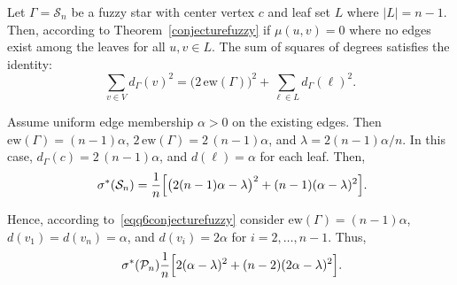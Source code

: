 \documentclass[12pt]{amsart}
\newcommand{\ew}{\mathrm{ew}}
\newcommand{\SF}{\sigma^*}
\begin{document}
Let $\Gamma=\mathcal{S}_n$ be a fuzzy star with center vertex $c$ and leaf set $L$ where $|L|=n-1$. Then, according to Theorem~\ref{conjecturefuzzy}  if $\mu(u,v) = 0$ where no edges exist among the leaves for all $u,v \in L$.
The sum of squares of degrees satisfies the identity:
\[
\sum_{v \in V} d_\Gamma(v)^2=\Big(2\,\ew(\Gamma)\Big)^2+\sum_{\ell \in L} d_\Gamma(\ell)^2.
\]



Assume uniform edge membership $\alpha > 0$ on the existing edges. Then $\ew(\Gamma)=(n-1)\alpha$,  $2\,\ew(\Gamma)=2\,(n-1)\alpha$, and  $\lambda=2(n-1)\alpha/n$.
In this case, $d_\Gamma(c)=2\,(n-1)\alpha$, and $d(\ell) = \alpha$ for each leaf. Then, 
\begin{equation}~\label{eqq6conjecturefuzzy}
 \SF(\mathcal{S}_n)=\frac{1}{n}\Bigl[\bigl(2(n-1)\alpha-\lambda\bigr)^2+(n-1)(\alpha-\lambda)^2\Bigr].
\end{equation}

Hence, according to~\eqref{eqq6conjecturefuzzy} consider $\ew(\Gamma)=(n-1)\alpha$, $d(v_1) = d(v_n) = \alpha$, and $d(v_i) = 2\alpha$ for $i = 2, \dots, n-1$. Thus,  
\begin{equation}~\label{eqq7conjecturefuzzy}
\SF(\mathcal{P}_n)\frac{1}{n} \Bigl[ 2(\alpha - \lambda)^2 + (n-2)(2\alpha - \lambda)^2 \Bigr].
\end{equation}
 
\end{document}
